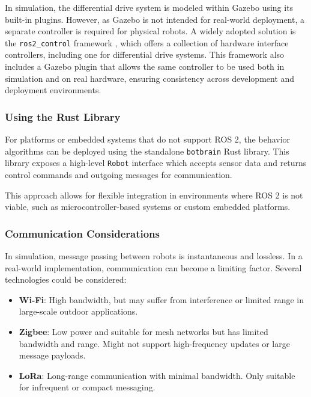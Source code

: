 In simulation, the differential drive system is modeled within Gazebo using its built-in plugins. 
However, as Gazebo is not intended for real-world deployment, a separate controller is required for physical robots. 
A widely adopted solution is the \texttt{ros2\_control} framework \cite{ros2-control}, which offers a collection of hardware interface controllers, including one for differential drive systems.
This framework also includes a Gazebo plugin that allows the same controller to be used both in simulation and on real hardware, ensuring consistency across development and deployment environments.

\subsubsection{Using the Rust Library}
For platforms or embedded systems that do not support ROS 2, the behavior algorithms can be deployed using the standalone \texttt{botbrain} Rust library. 
This library exposes a high-level \texttt{Robot} interface which accepts sensor data and returns control commands and outgoing messages for communication.


This approach allows for flexible integration in environments where ROS 2 is not viable, such as microcontroller-based systems or custom embedded platforms.

\subsubsection{Communication Considerations}\label{sub:communication}
In simulation, message passing between robots is instantaneous and lossless. 
In a real-world implementation, communication can become a limiting factor. 
Several technologies could be considered:

\begin{itemize}
  \item \textbf{Wi-Fi}: High bandwidth, but may suffer from interference or limited range in large-scale outdoor applications.
  \item \textbf{Zigbee}: Low power and suitable for mesh networks but has limited bandwidth and range. Might not support high-frequency updates or large message payloads.
  \item \textbf{LoRa}: Long-range communication with minimal bandwidth. Only suitable for infrequent or compact messaging.
\end{itemize}

